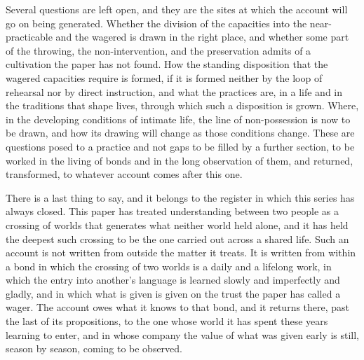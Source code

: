 Several questions are left open, and they are the sites at which the account will go on being generated. Whether the division of the capacities into the near-practicable and the wagered is drawn in the right place, and whether some part of the throwing, the non-intervention, and the preservation admits of a cultivation the paper has not found. How the standing disposition that the wagered capacities require is formed, if it is formed neither by the loop of rehearsal nor by direct instruction, and what the practices are, in a life and in the traditions that shape lives, through which such a disposition is grown. Where, in the developing conditions of intimate life, the line of non-possession is now to be drawn, and how its drawing will change as those conditions change. These are questions posed to a practice and not gaps to be filled by a further section, to be worked in the living of bonds and in the long observation of them, and returned, transformed, to whatever account comes after this one.

There is a last thing to say, and it belongs to the register in which this series has always closed. This paper has treated understanding between two people as a crossing of worlds that generates what neither world held alone, and it has held the deepest such crossing to be the one carried out across a shared life. Such an account is not written from outside the matter it treats. It is written from within a bond in which the crossing of two worlds is a daily and a lifelong work, in which the entry into another's language is learned slowly and imperfectly and gladly, and in which what is given is given on the trust the paper has called a wager. The account owes what it knows to that bond, and it returns there, past the last of its propositions, to the one whose world it has spent these years learning to enter, and in whose company the value of what was given early is still, season by season, coming to be observed.
